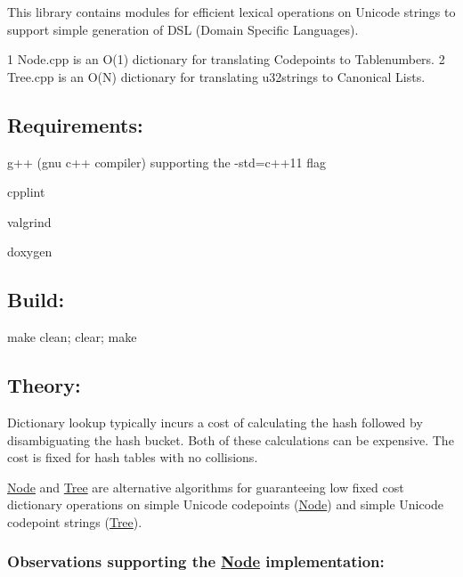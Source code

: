 This library contains modules for efficient lexical operations on Unicode strings to support simple generation of D\+S\+L (Domain Specific Languages).


\begin{DoxyCode}
1 Node.cpp is an O(1) dictionary for translating Codepoints to Tablenumbers.
2 Tree.cpp is an O(N) dictionary for translating u32strings to Canonical Lists.
\end{DoxyCode}


\subsection*{Requirements\+:}


\begin{DoxyItemize}
\item g++ (gnu c++ compiler) supporting the -\/std=c++11 flag
\item cpplint
\item valgrind
\item doxygen
\end{DoxyItemize}

\subsection*{Build\+:}


\begin{DoxyItemize}
\item make clean; clear; make
\end{DoxyItemize}

\subsection*{Theory\+:}

Dictionary lookup typically incurs a cost of calculating the hash followed by disambiguating the hash bucket. Both of these calculations can be expensive. The cost is fixed for hash tables with no collisions.

\hyperlink{class_node}{Node} and \hyperlink{class_tree}{Tree} are alternative algorithms for guaranteeing low fixed cost dictionary operations on simple Unicode codepoints (\hyperlink{class_node}{Node}) and simple Unicode codepoint strings (\hyperlink{class_tree}{Tree}).

\subsubsection*{Observations supporting the \hyperlink{class_node}{Node} implementation\+:}

